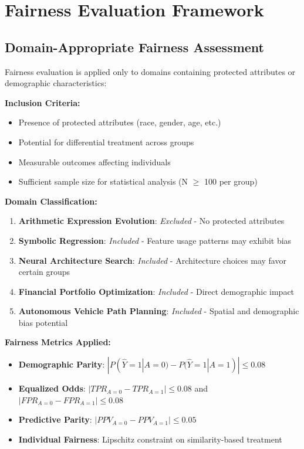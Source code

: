 \documentclass[sigconf,natbib]{acmart}
\begin{document}
\section{Fairness Evaluation Framework}
\label{app:fairness_framework}

\subsection{Domain-Appropriate Fairness Assessment}
Fairness evaluation is applied only to domains containing protected attributes or demographic characteristics:

\textbf{Inclusion Criteria:}
\begin{itemize}
    \item Presence of protected attributes (race, gender, age, etc.)
    \item Potential for differential treatment across groups
    \item Measurable outcomes affecting individuals
    \item Sufficient sample size for statistical analysis (N $\geq$ 100 per group)
\end{itemize}

\textbf{Domain Classification:}
\begin{enumerate}
    \item \textbf{Arithmetic Expression Evolution}: \textit{Excluded} - No protected attributes
    \item \textbf{Symbolic Regression}: \textit{Included} - Feature usage patterns may exhibit bias
    \item \textbf{Neural Architecture Search}: \textit{Included} - Architecture choices may favor certain groups
    \item \textbf{Financial Portfolio Optimization}: \textit{Included} - Direct demographic impact
    \item \textbf{Autonomous Vehicle Path Planning}: \textit{Included} - Spatial and demographic bias potential
\end{enumerate}

\textbf{Fairness Metrics Applied:}
\begin{itemize}
    \item \textbf{Demographic Parity}: $|P(\hat{Y} = 1 | A = 0) - P(\hat{Y} = 1 | A = 1)| \leq 0.08$
    \item \textbf{Equalized Odds}: $|TPR_{A=0} - TPR_{A=1}| \leq 0.08$ and $|FPR_{A=0} - FPR_{A=1}| \leq 0.08$
    \item \textbf{Predictive Parity}: $|PPV_{A=0} - PPV_{A=1}| \leq 0.05$
    \item \textbf{Individual Fairness}: Lipschitz constraint on similarity-based treatment
\end{itemize}
\end{document}
